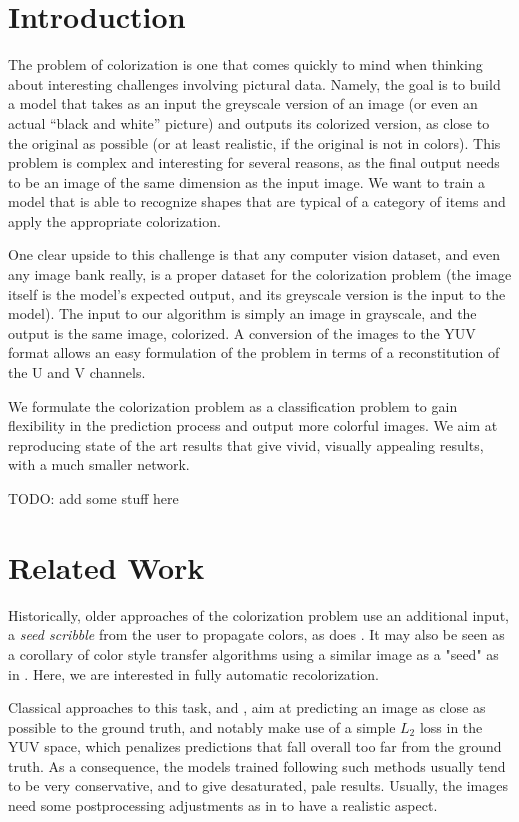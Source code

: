 \documentclass[10pt,twocolumn,letterpaper]{article}
\begin{document}
\section*{Introduction}

The problem of colorization is one that comes quickly to mind when thinking about interesting challenges involving pictural data. Namely, the goal is to build a model that takes as an input the greyscale version of an image (or even an actual ``black and white'' picture) and outputs its colorized version, as close to the original as possible (or at least realistic, if the original is not in colors). This problem is complex and interesting for several reasons, as the final output needs to be an image of the same dimension as the input image. We want to train a model that is able to recognize shapes that are typical of a category of items and apply the appropriate colorization.

One clear upside to this challenge is that any computer vision dataset, and even any image bank really, is a proper dataset for the colorization problem (the image itself is the model's expected output, and its greyscale version is the input to the model).
The input to our algorithm is simply an image in grayscale, and the output is the same image, colorized. A conversion of the images to the YUV format allows an easy formulation of the problem in terms of a reconstitution of the U and V channels.

We formulate the colorization problem as a classification problem to gain flexibility in the prediction process and output more colorful images. We aim at reproducing state of the art results that give vivid, visually appealing results, with a much smaller network.

TODO: add some stuff here

\section{Related Work} \label{relatedwork}

Historically, older approaches of the colorization problem use an additional input, a \textit{seed scribble} from the user to propagate colors, as does \cite{levin2004colorization}. It may also be seen as a corollary of color style transfer algorithms using a similar image as a "seed" as in \cite{he2017neuralct}. Here, we are interested in fully automatic recolorization.

Classical approaches to this task, \eg \cite{cheng2015deep} and \cite{dahl2016tinyclouds}, aim at predicting an image as close as possible to the ground truth, and notably make use of a simple $L_2$ loss in the YUV space, which penalizes predictions that fall overall too far from the ground truth. As a consequence, the models trained following such methods usually tend to be very conservative, and to give desaturated, pale results. Usually, the images need some postprocessing adjustments as in \cite{deshpande2015learning} to have a realistic aspect.
\end{document}
